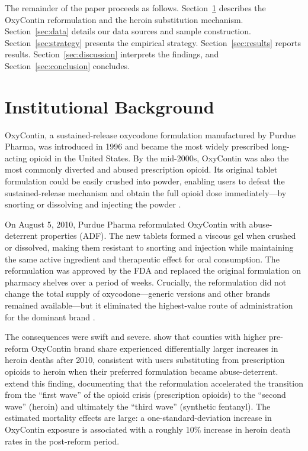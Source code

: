 \documentclass[12pt]{article}
\begin{document}
The remainder of the paper proceeds as follows. Section~\ref{sec:background} describes the OxyContin reformulation and the heroin substitution mechanism. Section~\ref{sec:data} details our data sources and sample construction. Section~\ref{sec:strategy} presents the empirical strategy. Section~\ref{sec:results} reports results. Section~\ref{sec:discussion} interprets the findings, and Section~\ref{sec:conclusion} concludes.


\section{Institutional Background}
\label{sec:background}

OxyContin, a sustained-release oxycodone formulation manufactured by Purdue Pharma, was introduced in 1996 and became the most widely prescribed long-acting opioid in the United States. By the mid-2000s, OxyContin was also the most commonly diverted and abused prescription opioid. Its original tablet formulation could be easily crushed into powder, enabling users to defeat the sustained-release mechanism and obtain the full opioid dose immediately---by snorting or dissolving and injecting the powder \citep{butler2011, cicero2012}.

On August 5, 2010, Purdue Pharma reformulated OxyContin with abuse-deterrent properties (ADF). The new tablets formed a viscous gel when crushed or dissolved, making them resistant to snorting and injection while maintaining the same active ingredient and therapeutic effect for oral consumption. The reformulation was approved by the FDA and replaced the original formulation on pharmacy shelves over a period of weeks. Crucially, the reformulation did not change the total supply of oxycodone---generic versions and other brands remained available---but it eliminated the highest-value route of administration for the dominant brand \citep{alpert2018}.

The consequences were swift and severe. \citet{alpert2018} show that counties with higher pre-reform OxyContin brand share experienced differentially larger increases in heroin deaths after 2010, consistent with users substituting from prescription opioids to heroin when their preferred formulation became abuse-deterrent. \citet{evans2019} extend this finding, documenting that the reformulation accelerated the transition from the ``first wave'' of the opioid crisis (prescription opioids) to the ``second wave'' (heroin) and ultimately the ``third wave'' (synthetic fentanyl). The estimated mortality effects are large: a one-standard-deviation increase in OxyContin exposure is associated with a roughly 10\% increase in heroin death rates in the post-reform period.
\end{document}
